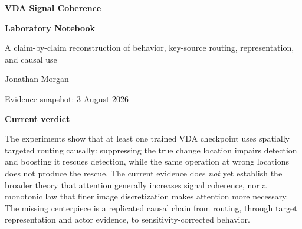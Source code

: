 \documentclass[11pt]{article}
\begin{document}
\begin{titlepage}
\thispagestyle{empty}
\vspace*{0.28in}
{\sffamily\bfseries\color{Navy}\fontsize{31}{34}\selectfont VDA Signal Coherence\par}
{\sffamily\bfseries\color{Blue}\fontsize{25}{28}\selectfont Laboratory Notebook\par}
\vspace{0.14in}
{\sffamily\Large A claim-by-claim reconstruction of behavior, key-source routing, representation, and causal use\par}

\vspace{0.32in}
{\large Jonathan Morgan\par}
{\color{TextGray}Evidence snapshot: 3 August 2026\par}

\vspace{0.32in}

\vspace{0.25in}
{\sffamily\Large\bfseries\color{Navy}Current verdict\par}
\vspace{3pt}
{\fontsize{15}{19}\selectfont
The experiments show that at least one trained VDA checkpoint uses spatially targeted routing causally: suppressing the true change location impairs detection and boosting it rescues detection, while the same operation at wrong locations does not produce the rescue. The current evidence does \emph{not} yet establish the broader theory that attention generally increases signal coherence, nor a monotonic law that finer image discretization makes attention more necessary. The missing centerpiece is a replicated causal chain from routing, through target representation and actor evidence, to sensitivity-corrected behavior.
\par}

\end{titlepage}
\end{document}
